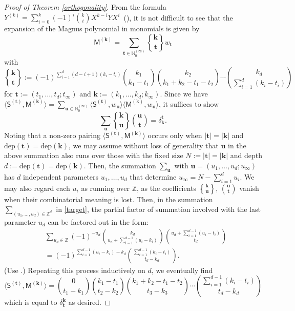 \documentclass[10pt]{article}
\theoremstyle{definition}
\theoremstyle{remark}
\DeclareRobustCommand{\magnus}{\genfrac\{\}{0pt}{}}
\def\bk{{\mathbf{k}}}
\def\MM{{\mathsf{M}}}
\def\SS{{\mathsf{S}}}
\def\dep{\mathrm{dep}}
\def\bt{{\mathbf{t}}}
\def\bu{{\mathbf{u}}}
\def\lp{\langle}
\def\rp{\rangle}
\def\N{{\mathbb N}}
\def\Z{{\mathbb Z}}
\begin{document}
\begin{proof}[Proof of Theorem \ref{orthogonality}]
From the formula~$Y^{(k)}=\sum_{i=0}^k (-1)^i\binom{k}{i}X^{k-i}YX^i$~(\cite[(4)]{M37}), 
it is not difficult to see that the expansion of the Magnus polynomial in monomials
is given by 
\begin{equation} \label{Mag-Mono}
\MM^{(\bk)}=\sum_{\bt \in\N_0^{(\infty)}}
\magnus{\bk}{\bt} w_{\bt} 
\end{equation}
with
\begin{equation}
\label{MagnusBino}
\magnus{\bk}{\bt}:=(-1)^{\sum_{i=1}^d (d-i+1)(k_i-t_i)}
\binom{k_1}{k_1-t_1} 
\binom{k_2}{k_1+k_2-t_1-t_2} \cdots
\binom{k_d}{\sum_{i=1}^d(k_i-t_i)}
\end{equation}
for $\bt:=(t_1,\dots, t_d;t_\infty)$ and $\bk:=(k_1,\dots,k_d;k_\infty)$.
Since we have $\lp\SS^{(\bt)},\MM^{(\bk)}\rp=\sum_{\bu\in\N_0^{(\infty)}}
\lp\SS^{(\bt)},w_\bu\rp \lp\MM^{(\bk)},w_\bu\rp$, it suffices to show
\begin{equation} \label{target}
\sum_\bu \magnus{\bk}{\bu} \binom{\bu}{\bt}=\delta_\bk^\bt.
\end{equation}
Noting that a non-zero pairing $\lp\SS^{(\bt)},\MM^{(\bk)}\rp$ occurs only when
$|\bt|=|\bk|$ and $\dep(\bt)=\dep(\bk)$, we may assume without loss of generality 
that $\bu$ in the above summation also runs over those
with the fixed size $N:=|\bt|=|\bk|$ and depth $d:=\dep(\bt)=\dep(\bk)$.
Then, the summation $\sum_\bu$ with $\bu=(u_1,\dots,u_d;u_\infty)$ 
has $d$ independent parameters $u_1,\dots, u_d$ that determine 
$u_\infty=N-\sum_{i=1}^d u_i$. We may also regard each $u_i$ as running over $\Z$,
as the coefficients $\magnus{\bk}{\bu}$, $\binom{\bu}{\bt}$ vanish when 
their combinatorial meaning is lost.
Then, in the summation $\sum_{(u_1,\dots,u_d)\in\Z^d}$ in \eqref{target},
the partial factor of summation 
involved with the last parameter $u_d$ can be factored out in the form:
\begin{align*}
&
\sum_{u_d\in\Z}(-1)^{-u_d}
\binom{k_d}{u_d+\sum_{i=1}^{d-1}(u_i-k_i)}
\binom{u_d+\sum_{i=1}^{d-1}(u_i-t_i)}{t_d} \\
&=
(-1)^{\sum_{i=1}^{d-1}(u_i-k_i)-k_d}
\binom{\sum_{i=1}^{d-1}(k_i-t_i)}{t_d-k_d}.
\end{align*}
(Use \cite[(5.24)]{GKP}.)
Repeating this process inductively on $d$, we eventually find
$$
\lp\SS^{(\bt)},\MM^{(\bk)}\rp=
\binom{0}{t_1-k_1}
\binom{k_1-t_1}{t_2-k_2}
\binom{k_1+k_2-t_1-t_2}{t_3-k_3}
\cdots
\binom{\sum_{i=1}^{d-1}(k_i-t_i)}{t_d-k_d}
$$
which is equal to $\delta^\bk_\bt$ as desired.
\end{proof}
\end{document}
